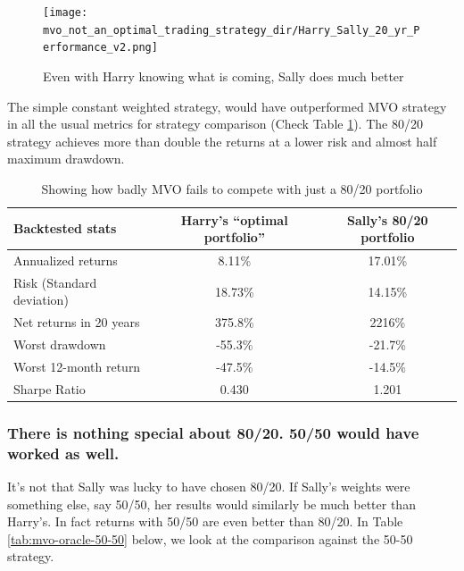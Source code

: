 \documentclass[a4paper]{article}
\begin{document}
\begin{figure}[h!]
\centering
\texttt{[image: mvo\_not\_an\_optimal\_trading\_strategy\_dir/Harry\_Sally\_20\_yr\_Performance\_v2.png]}
\caption{\label{fig:Harry_Sally_20_yr_Performance} Even with Harry knowing what is coming, Sally does much better}
\end{figure}

The simple constant weighted strategy, would have outperformed MVO strategy in all the usual metrics for strategy comparison (Check Table \ref{tab:mvo-oracle-80-20}). The 80/20 strategy achieves more than double the returns at a lower risk and almost half maximum drawdown. 

\begin{table}
	\centering
	\begin{tabular}{l c c}
		\rowcolor{header}
		\hline
		Backtested stats & Harry’s “optimal portfolio” & Sally’s 80/20 portfolio  \\ 
		\hline
		Annualized returns & 8.11\% & 17.01\% \\ 
		Risk (Standard deviation) & 18.73\% & 14.15\% \\
		Net returns in 20 years & 375.8\% & 2216\% \\
		Worst drawdown & -55.3\% & -21.7\% \\
		Worst 12-month return & -47.5\% & -14.5\% \\
		Sharpe Ratio & 0.430 & 1.201 \\
		
	\end{tabular}
	\caption{\label{tab:mvo-oracle-80-20}Showing how badly MVO fails to compete with just a 80/20 portfolio}
\end{table} 



\newpage

\subsubsection{There is nothing special about 80/20. 50/50 would have worked as well.}

It's not that Sally was lucky to have chosen 80/20. If Sally’s weights were something else, say 50/50, her results would similarly be much better than Harry’s. In fact returns with 50/50 are even better than 80/20. In Table \ref{tab:mvo-oracle-50-50} below, we look at the comparison against the 50-50 strategy. 
\end{document}
